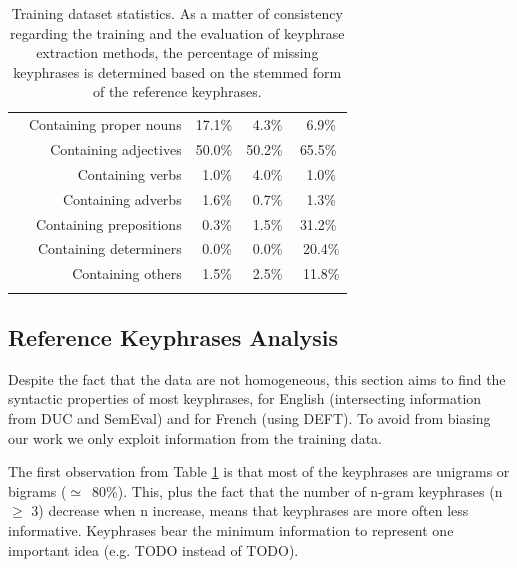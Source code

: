 \begin{table}
\begin{tabular}{rrccc}
        & Containing proper nouns & 17.1\% & $~~$4.3\% & $~~$6.9\%\\
        & Containing adjectives & 50.0\% & 50.2\% & 65.5\%\\
        & Containing verbs & $~~$1.0\% & $~~$4.0\% & $~~$1.0\%\\
        & Containing adverbs & $~~$1.6\% & $~~$0.7\% & $~~$1.3\%\\
        & Containing prepositions & $~~$0.3\% & $~~$1.5\% & 31.2\%\\
        & Containing determiners & $~~$0.0\% & $~~$0.0\% & $~~$20.4\%\\
        & Containing others & $~~$1.5\% & $~~$2.5\% & $~~$11.8\%\\
        \addlinespace[.5\defaultaddspace]
        \bottomrule
      \end{tabular}
      \caption{Training dataset statistics. As a matter of consistency regarding
               the training and the evaluation of keyphrase extraction methods,
               the percentage of missing keyphrases is determined based on the
               stemmed form of the reference keyphrases.
               \label{tab:train_dataset_statistics}}
    \end{table}

  \subsection{Reference Keyphrases Analysis}
  \label{subsec:keyphrase_analysis}
    Despite the fact that the data are not homogeneous, this section aims to
    find the syntactic properties of most keyphrases, for English (intersecting
    information from DUC and SemEval) and for French (using DEFT). To avoid from
    biasing our work we only exploit information from the training data.

    The first observation from Table \ref{tab:train_dataset_statistics} is that
    most of the keyphrases are unigrams or bigrams ($\simeq$~80\%). This, plus
    the fact that the number of n-gram keyphrases (n $\geq$ 3) decrease when n
    increase, means that keyphrases are more often less informative. Keyphrases
    bear the minimum information to represent one important idea (e.g. TODO
    instead of TODO).

